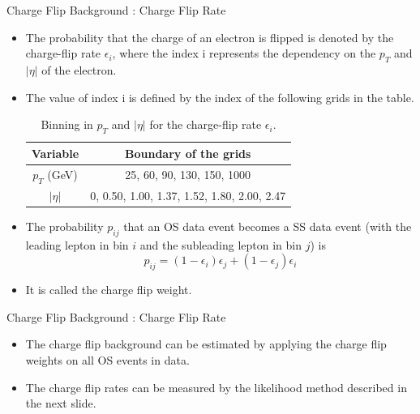 \documentclass[mathserif,serif]{beamer}
\begin{document}
\begin{frame}{Charge Flip Background : Charge Flip Rate}
\begin{itemize}
\item The probability that the charge of an electron is flipped is denoted by the charge-flip rate $\epsilon_i$, where the index i represents the dependency on the $p_T$ and $|\eta|$ of the electron.
\item The value of index i is defined by the index of the following grids in the table.

\begin{table}[htbp]
\centering
\begin{tabular}{|c|c|}
\hline
Variable & Boundary of the grids \\
\hline
$p_T$ (GeV) &  25, 60, 90, 130, 150, 1000 \\
\hline
$|\eta|$ & 0, 0.50, 1.00, 1.37, 1.52, 1.80, 2.00, 2.47 \\
\hline
\end{tabular}
\caption{Binning in $p_T$ and $|\eta|$ for the charge-flip rate $\epsilon_i$.}
\end{table}

\item The probability $p_{ij}$ that an OS data event becomes a SS data event (with the leading lepton in bin $i$ and the subleading lepton in bin $j$) is
\begin{equation*}
p_{ij} = (1 - \epsilon_i)\epsilon_j + (1 - \epsilon_j)\epsilon_i
\end{equation*}
\item It is called the charge flip weight.
\end{itemize}

\end{frame}

\begin{frame}{Charge Flip Background : Charge Flip Rate}
\begin{itemize}
\item The charge flip background can be estimated by applying the charge flip weights on all OS events in data.
\item The charge flip rates can be measured by the likelihood method described in the next slide.
\end{itemize}
\end{frame}
\end{document}
